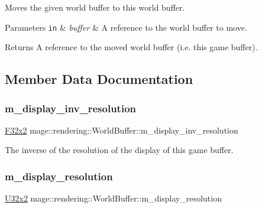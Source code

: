 Moves the given world buffer to this world buffer.


\begin{DoxyParams}[1]{Parameters}
\mbox{\tt in}  & {\em buffer} & A reference to the world buffer to move. \\
\hline
\end{DoxyParams}
\begin{DoxyReturn}{Returns}
A reference to the moved world buffer (i.\+e. this game buffer). 
\end{DoxyReturn}


\subsection{Member Data Documentation}
\mbox{\label{structmage_1_1rendering_1_1_world_buffer_a14b9521f67adaa823bdb9c45d833be1a}} 
\subsubsection{\texorpdfstring{m\+\_\+display\+\_\+inv\+\_\+resolution}{m\_display\_inv\_resolution}}
{\footnotesize\ttfamily \mbox{\hyperlink{namespacemage_a9dc0d34d6ecc87e4cfa4a826102117bc}{F32x2}} mage\+::rendering\+::\+World\+Buffer\+::m\+\_\+display\+\_\+inv\+\_\+resolution}

The inverse of the resolution of the display of this game buffer. \mbox{\label{structmage_1_1rendering_1_1_world_buffer_aafc4835b9b42d7688b3930768f732ea0}} 
\subsubsection{\texorpdfstring{m\+\_\+display\+\_\+resolution}{m\_display\_resolution}}
{\footnotesize\ttfamily \mbox{\hyperlink{namespacemage_a31f2bb52b5080e706e1c13de07c0a249}{U32x2}} mage\+::rendering\+::\+World\+Buffer\+::m\+\_\+display\+\_\+resolution}

